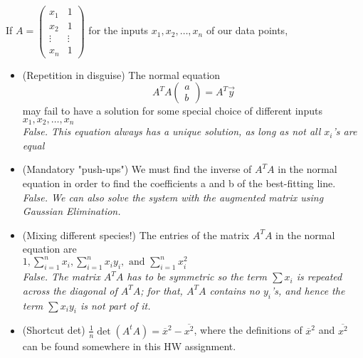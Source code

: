 \documentclass [11pt, letterpaper] {amsart}
\theoremstyle{plain}
\theoremstyle{definition}
\renewcommand{\b}{\mathbf{b}}
\newcommand{\x}{\mathbf{x}}
\begin{document}
\begin{enumerate}
                    
                        If $A=\left(\begin{array}{cc} x_1&1\\x_2&1\\\vdots&\vdots\\ x_n&1\end{array}\right)$   for the inputs  $x_1,x_2,\ldots,x_n$ of our data points,\\
                        \begin{itemize}
                            \item 
                        (Repetition in disguise) The normal equation $$ A^TA\left(\begin{array}{c}a\\b\end{array}\right)=A^T\vec{y}$$  may fail to have a solution for some special choice of different inputs  $x_1,x_2,\ldots,x_n$
\\
    \emph{False. This equation always has a unique solution, as long as not all $x_i$'s are equal}\\\item 
                            (Mandatory "push-ups") We must find the inverse of  $A^TA$ in the normal equation in order to find the coefficients a  and  b  of the best-fitting line.
\\
    \emph{False. We can also solve the system with the augmented matrix using Gaussian Elimination.}\\\item 
                            (Mixing different species!) The entries of the matrix $A^TA$  in the normal equation are  \\$1, \sum_{i=1}^nx_i, \sum_{i=1}^nx_iy_i, \text{ and } \sum_{i=1}^nx_i^2 $
\\
    \emph{False. The matrix $A^TA$ has to be symmetric so the term $\sum x_i$ is repeated across the diagonal of $A^TA$; for that, $A^TA$ contains no $y_i$'s, and hence the term $\sum x_iy_i $ is not part of it.}\\\item 
    
            (Shortcut det) $ \frac{1}{n}\det(A^tA)=\overline{x}^2-\overline{x^2} $, where the definitions of $\overline{x}^2$  and  $\overline{x^2}$   can be found somewhere in this HW assignment.
                    

\end{itemize}
\end{enumerate}
\end{document}
